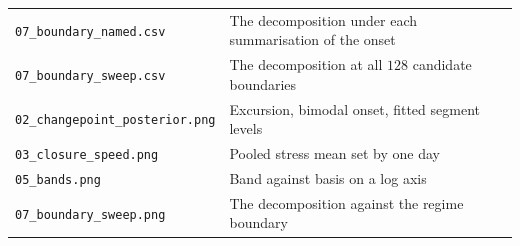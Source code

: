 \documentclass[11pt,a4paper]{article}
\newcommand{\code}[1]{\texttt{\small #1}}
\begin{document}
\begin{tabularx}{\linewidth}{@{}lX@{}}
\code{07\_boundary\_named.csv} & The decomposition under each summarisation of the onset \\
\code{07\_boundary\_sweep.csv} & The decomposition at all $128$ candidate boundaries \\
\midrule
\code{02\_changepoint\_posterior.png} & Excursion, bimodal onset, fitted segment levels \\
\code{03\_closure\_speed.png} & Pooled stress mean set by one day \\
\code{05\_bands.png} & Band against basis on a log axis \\
\code{07\_boundary\_sweep.png} & The decomposition against the regime boundary \\
\bottomrule
\end{tabularx}
\end{document}
